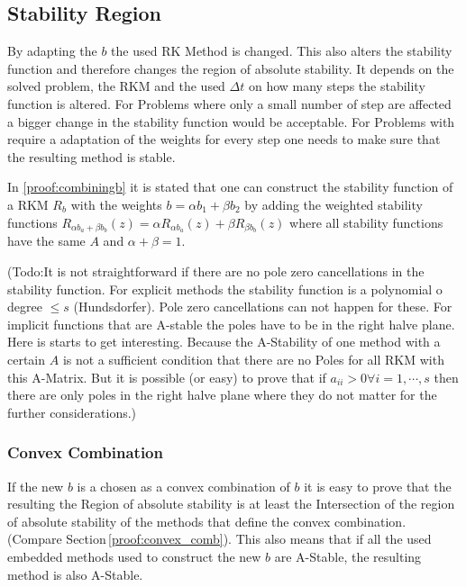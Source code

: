\documentclass{article}
\begin{document}
\subsection{Stability Region}

By adapting the $b$ the used RK Method is changed. This also alters the stability function and therefore changes the region of absolute stability. 
It depends on the solved problem, the RKM and the used $\Delta t$ on how many steps the stability function is altered. For Problems where only a small number of step are affected a bigger change in the stability function would be acceptable. For Problems with require a adaptation of the weights for every step one needs to make sure that the resulting method is stable.


In \ref{proof:combiningb} it is stated that one can construct the stability function of a RKM  $R_b$  with the weights $b = \alpha b_1 + \beta b_2$ by adding the weighted stability functions $R_{\alpha b_a+\beta b_b}(z) = \alpha R_{\alpha b_a}(z) + \beta R_{\beta b_b}(z) $ where all stability functions have the same $A$ and $\alpha + \beta = 1$.

(Todo:It is not straightforward if there are no pole zero cancellations in the stability function. For explicit methods the stability function is a polynomial o degree $\leq s$ (Hundsdorfer). Pole zero cancellations can not happen for these. For implicit functions that are A-stable the poles have to be in the right halve plane. Here is starts to get interesting. Because the A-Stability of one method with a certain $A$ is not a sufficient  condition that there are no Poles for all RKM with this A-Matrix. But it is possible (or easy) to prove that if $a_{ii} > 0 \forall i = 1,\cdots , s$ then there are only poles in the right halve plane where they do not matter for the further considerations.)



\subsubsection{Convex Combination}
If the new $b$ is a chosen as a convex combination of $b$ it is easy to prove that the resulting  the Region of absolute stability is at least the Intersection of the region of absolute stability of the methods that define the convex combination. (Compare Section\,\ref{proof:convex_comb}). This also means that if all the used embedded methods used to construct the new $b$ are A-Stable, the resulting method is also A-Stable.
\end{document}
